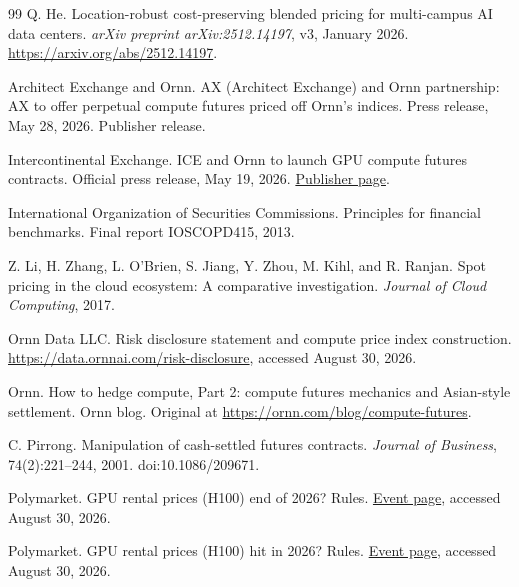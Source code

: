\documentclass[10pt,twocolumn]{article}
\begin{document}
\begin{thebibliography}{99}
Q. He.
\newblock Location-robust cost-preserving blended pricing for multi-campus AI data centers.
\newblock \emph{arXiv preprint arXiv:2512.14197}, v3, January 2026.
\newblock \url{https://arxiv.org/abs/2512.14197}.

Architect Exchange and Ornn.
\newblock AX (Architect Exchange) and Ornn partnership: AX to offer perpetual
compute futures priced off Ornn's indices.
\newblock Press release, May 28, 2026.
\newblock Publisher release.

Intercontinental Exchange.
\newblock ICE and Ornn to launch GPU compute futures contracts.
\newblock Official press release, May 19, 2026.
\newblock \href{https://ir.theice.com/press/news-details/2026/ICE-and-Ornn-to-Launch-GPU-Compute-Futures-Contracts/default.aspx}{Publisher page}.

International Organization of Securities Commissions.
\newblock Principles for financial benchmarks.
\newblock Final report IOSCOPD415, 2013.

Z. Li, H. Zhang, L. O'Brien, S. Jiang, Y. Zhou, M. Kihl, and R. Ranjan.
\newblock Spot pricing in the cloud ecosystem: A comparative investigation.
\newblock \emph{Journal of Cloud Computing}, 2017.

Ornn Data LLC.
\newblock Risk disclosure statement and compute price index construction.
\newblock \url{https://data.ornnai.com/risk-disclosure}, accessed August 30, 2026.

Ornn.
\newblock How to hedge compute, Part 2: compute futures mechanics and Asian-style
settlement.
\newblock Ornn blog.
\newblock Original at \url{https://ornn.com/blog/compute-futures}.

C. Pirrong.
\newblock Manipulation of cash-settled futures contracts.
\newblock \emph{Journal of Business}, 74(2):221--244, 2001.
\newblock doi:10.1086/209671.

Polymarket.
\newblock GPU rental prices (H100) end of 2026? Rules.
\newblock \href{https://polymarket.com/event/gpu-rental-prices-h100-end-of-2026-20260709164334623}{Event page}, accessed August 30, 2026.

Polymarket.
\newblock GPU rental prices (H100) hit in 2026? Rules.
\newblock \href{https://polymarket.com/event/gpu-rental-prices-h100-hit-in-2026-20260709165909063}{Event page}, accessed August 30, 2026.


\end{thebibliography}
\end{document}
